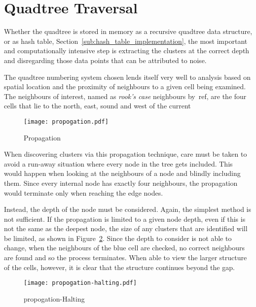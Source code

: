 
\section{Quadtree Traversal}
\label{sec:quadtree_traversal}

Whether the quadtree is stored in memory as a recursive quadtree data
structure, or as hash table, Section~\ref{sub:hash_table_implementation}, the
most important and computationally intensive step is extracting the clusters at
the correct depth and disregarding those data points that can be attributed to
noise.

The quadtree numbering system chosen lends itself very well to analysis based
on spatial location and the proximity of neighbours to a given cell being
examined. The neighbours of interest, named as \emph{rook's case} neighbours
by~ref{}, are the four cells that lie to the north, east, sound and west of the
current

\begin{figure}[tbhp]
	\centering
	\texttt{[image: propogation.pdf]}
	\caption{Propagation}
	\label{fig:propogation}
\end{figure}

When discovering clusters via this propagation technique, care must be taken to
avoid a run-away situation where every node in the tree gets included. This
would happen when looking at the neighbours of a node and blindly including
them. Since every internal node has exactly four neighbours, the propagation
would terminate only when reaching the edge nodes.

Instead, the depth of the node must be considered. Again, the simplest method
is not sufficient. If the propagation is limited to a given node depth, even if
this is not the same as the deepest node, the size of any clusters that are
identified will be limited, as shown in Figure~\ref{fig:propogation-halting}.
Since the depth to consider is not able to change, when the neighbours of the
blue cell are checked, no correct neighbours are found and so the process
terminates. When able to view the larger structure of the cells, however, it is
clear that the structure continues beyond the gap.

\begin{figure}[tbhp]
	\centering
	\texttt{[image: propogation-halting.pdf]}
	\caption{propogation-Halting}
	\label{fig:propogation-halting}
\end{figure}

